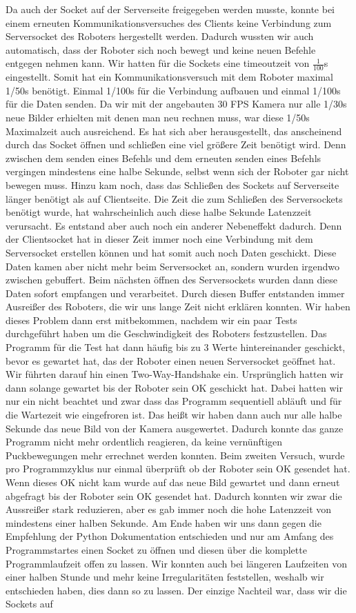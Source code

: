 Da auch der Socket auf der Serverseite freigegeben werden musste, konnte bei einem erneuten Kommunikationsversuches des Clients keine Verbindung zum Serversocket des Roboters hergestellt werden. Dadurch wussten wir auch automatisch, dass der Roboter sich noch bewegt und keine neuen Befehle entgegen nehmen kann. Wir hatten für die Sockets eine timeoutzeit von $\frac{1}{100}$s eingestellt. Somit hat ein Kommunikationsversuch mit dem Roboter maximal 1/50s benötigt. Einmal  1/100s für die Verbindung aufbauen und einmal 1/100s für die Daten senden. Da wir mit der angebauten 30 FPS Kamera nur alle 1/30s neue Bilder erhielten mit denen man neu rechnen muss, war diese 1/50s Maximalzeit auch ausreichend. Es hat sich aber herausgestellt, das anscheinend durch das Socket öffnen und schließen eine viel größere Zeit benötigt wird. Denn zwischen dem senden eines Befehls und dem erneuten senden eines Befehls vergingen mindestens eine halbe Sekunde, selbst wenn sich der Roboter gar nicht bewegen muss. Hinzu kam noch, dass das Schließen des Sockets auf Serverseite länger benötigt als auf Clientseite. Die Zeit die zum Schließen des Serversockets benötigt wurde, hat wahrscheinlich auch diese halbe Sekunde Latenzzeit verursacht. Es entstand aber auch noch ein anderer Nebeneffekt dadurch. Denn der Clientsocket hat in dieser Zeit immer noch eine Verbindung mit dem Serversocket erstellen können und hat somit auch noch Daten geschickt. Diese Daten kamen aber nicht mehr beim Serversocket an, sondern wurden irgendwo zwischen gebuffert. Beim nächsten öffnen des Serversockets wurden dann diese Daten sofort empfangen und verarbeitet. Durch diesen Buffer entstanden immer Ausreißer des Roboters, die wir uns lange Zeit nicht erklären konnten. Wir haben dieses Problem dann erst mitbekommen, nachdem wir ein paar Tests durchgeführt haben um die Geschwindigkeit des Roboters festzustellen. Das Programm für die Test hat dann häufig bis zu 3 Werte hintereinander geschickt, bevor es gewartet hat, das der Roboter einen neuen Serversocket geöffnet hat. Wir führten darauf hin einen Two-Way-Handshake ein. Ursprünglich hatten wir dann solange gewartet bis der Roboter sein OK geschickt hat. Dabei hatten wir nur ein nicht beachtet und zwar dass das Programm sequentiell abläuft und für die Wartezeit wie eingefroren ist. Das heißt wir haben dann auch nur alle halbe Sekunde das neue Bild von der Kamera ausgewertet. Dadurch konnte das ganze Programm nicht mehr ordentlich reagieren, da keine vernünftigen Puckbewegungen mehr errechnet werden konnten. Beim zweiten Versuch, wurde pro Programmzyklus nur einmal überprüft ob der Roboter sein OK gesendet hat. Wenn dieses OK nicht kam wurde auf das neue Bild gewartet und dann erneut abgefragt bis der Roboter sein OK gesendet hat. Dadurch konnten wir zwar die Aussreißer stark reduzieren, aber es gab immer noch die hohe Latenzzeit von mindestens einer halben Sekunde. Am Ende haben wir uns dann gegen die Empfehlung der Python Dokumentation entschieden und nur am Amfang des Programmstartes einen Socket zu öffnen und diesen über die komplette Programmlaufzeit offen zu lassen. Wir konnten auch bei längeren Laufzeiten von einer halben Stunde und mehr keine Irregularitäten feststellen, weshalb wir entschieden haben, dies dann so zu lassen. Der einzige Nachteil war, dass wir die Sockets auf 